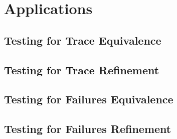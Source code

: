 \section{Applications}
\label{sec:case}



\subsection{Testing for Trace Equivalence}
 

\subsection{Testing for Trace Refinement}
 



\subsection{Testing for Failures Equivalence}
 

\subsection{Testing for Failures Refinement}
 


